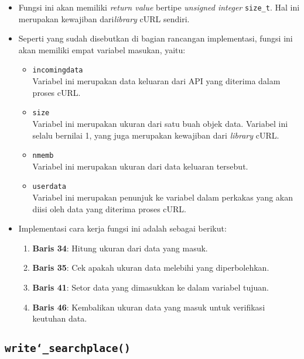 \begin{itemize}
	\item Fungsi ini akan memiliki \textit{return value} bertipe \textit{unsigned integer} \verb|size_t|. Hal ini merupakan kewajiban dari\textit{library} cURL sendiri.
	\item Seperti yang sudah disebutkan di bagian rancangan implementasi, fungsi ini akan memiliki empat variabel masukan, yaitu:
	
	\begin{itemize}
		\item \verb|incomingdata| \\
		Variabel ini merupakan data keluaran dari API yang diterima dalam proses cURL.
		\item \verb|size| \\
		Variabel ini merupakan ukuran dari satu buah objek data. Variabel ini selalu bernilai 1, yang juga merupakan kewajiban dari \textit{library} cURL.
		\item \verb|nmemb| \\
		Variabel ini merupakan ukuran dari data keluaran tersebut.
		\item \verb|userdata| \\
		Variabel ini merupakan penunjuk ke variabel dalam perkakas yang akan diisi oleh data yang diterima proses cURL.
	\end{itemize}
	
	\item Implementasi cara kerja fungsi ini adalah sebagai berikut:
	
	\begin{enumerate}
		\item \textbf{Baris 34}: Hitung ukuran dari data yang masuk.
		\item \textbf{Baris 35}: Cek apakah ukuran data melebihi yang diperbolehkan.
		\item \textbf{Baris 41}: Setor data yang dimasukkan ke dalam variabel tujuan.
		\item \textbf{Baris 46}: Kembalikan ukuran data yang masuk untuk verifikasi keutuhan data.
	\end{enumerate}
\end{itemize}

\subsection{\texttt{write\char`_searchplace()}}
\label{sec:testing-implementation-write-searchplace}

